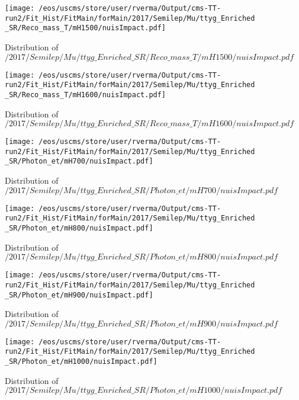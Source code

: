 \begin{figure}
\centering
\texttt{[image: /eos/uscms/store/user/rverma/Output/cms-TT-run2/Fit\_Hist/FitMain/forMain/2017/Semilep/Mu/ttyg\_Enriched\_SR/Reco\_mass\_T/mH1500/nuisImpact.pdf]}
\caption{Distribution of $/2017/Semilep/Mu/ttyg\_Enriched\_SR/Reco\_mass\_T/mH1500/nuisImpact.pdf$}
\end{figure}

\begin{figure}
\centering
\texttt{[image: /eos/uscms/store/user/rverma/Output/cms-TT-run2/Fit\_Hist/FitMain/forMain/2017/Semilep/Mu/ttyg\_Enriched\_SR/Reco\_mass\_T/mH1600/nuisImpact.pdf]}
\caption{Distribution of $/2017/Semilep/Mu/ttyg\_Enriched\_SR/Reco\_mass\_T/mH1600/nuisImpact.pdf$}
\end{figure}

\begin{figure}
\centering
\texttt{[image: /eos/uscms/store/user/rverma/Output/cms-TT-run2/Fit\_Hist/FitMain/forMain/2017/Semilep/Mu/ttyg\_Enriched\_SR/Photon\_et/mH700/nuisImpact.pdf]}
\caption{Distribution of $/2017/Semilep/Mu/ttyg\_Enriched\_SR/Photon\_et/mH700/nuisImpact.pdf$}
\end{figure}

\begin{figure}
\centering
\texttt{[image: /eos/uscms/store/user/rverma/Output/cms-TT-run2/Fit\_Hist/FitMain/forMain/2017/Semilep/Mu/ttyg\_Enriched\_SR/Photon\_et/mH800/nuisImpact.pdf]}
\caption{Distribution of $/2017/Semilep/Mu/ttyg\_Enriched\_SR/Photon\_et/mH800/nuisImpact.pdf$}
\end{figure}

\begin{figure}
\centering
\texttt{[image: /eos/uscms/store/user/rverma/Output/cms-TT-run2/Fit\_Hist/FitMain/forMain/2017/Semilep/Mu/ttyg\_Enriched\_SR/Photon\_et/mH900/nuisImpact.pdf]}
\caption{Distribution of $/2017/Semilep/Mu/ttyg\_Enriched\_SR/Photon\_et/mH900/nuisImpact.pdf$}
\end{figure}

\begin{figure}
\centering
\texttt{[image: /eos/uscms/store/user/rverma/Output/cms-TT-run2/Fit\_Hist/FitMain/forMain/2017/Semilep/Mu/ttyg\_Enriched\_SR/Photon\_et/mH1000/nuisImpact.pdf]}
\caption{Distribution of $/2017/Semilep/Mu/ttyg\_Enriched\_SR/Photon\_et/mH1000/nuisImpact.pdf$}
\end{figure}

